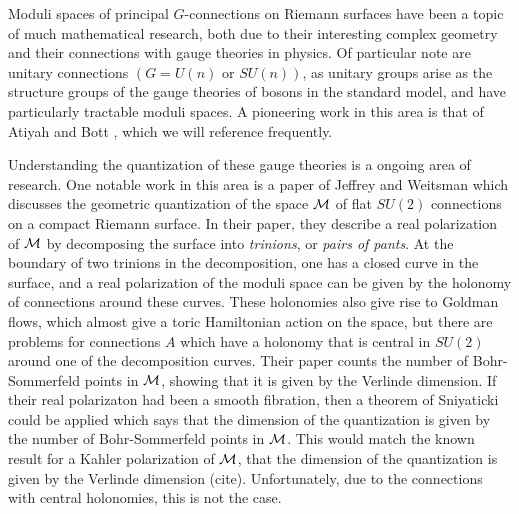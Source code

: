 

	Moduli spaces of principal $G$-connections on Riemann surfaces have been a topic of much mathematical research, both due to their interesting complex geometry and their connections with gauge theories in physics. Of particular note are unitary connections $(G=U(n) \text{ or }SU(n))$, as unitary groups arise as the structure groups of the gauge theories of bosons in the standard model, and have particularly tractable moduli spaces. A pioneering work in this area is that of Atiyah and Bott \cite{atiyah_yang-mills_1983}, which we will reference frequently. 
	
	Understanding the quantization of these gauge theories is a ongoing area of research. One notable work in this area is a paper of Jeffrey and Weitsman \cite{jeffrey_bohr-sommerfeld_1992} which discusses the geometric quantization of the space $\mathcal{M}$ of flat $SU(2)$ connections on a compact Riemann surface. In their paper, they describe a real polarization of $\mathcal{M}$ by decomposing the surface into \textit{trinions}, or \textit{pairs of pants}. At the boundary of two trinions in the decomposition, one has a closed curve in the surface, and a real polarization of the moduli space can be given by the holonomy of connections around these curves. These holonomies also give rise to Goldman flows, which almost give a toric Hamiltonian action on the space, but there are problems for connections $A$ which have a holonomy that is central in $SU(2)$ around one of the decomposition curves. Their paper counts the number of Bohr-Sommerfeld points in $\mathcal{M}$, showing that it is given by the Verlinde dimension. If their real polarizaton had been a smooth fibration, then a theorem of Sniyaticki could be applied which says that the dimension of the quantization is given by the number of Bohr-Sommerfeld points in $\mathcal{M}$. This would match the known result for a Kahler polarization of $\mathcal{M}$, that the dimension of the quantization is given by the Verlinde dimension (cite). Unfortunately, due to the connections with central holonomies, this is not the case.
	
